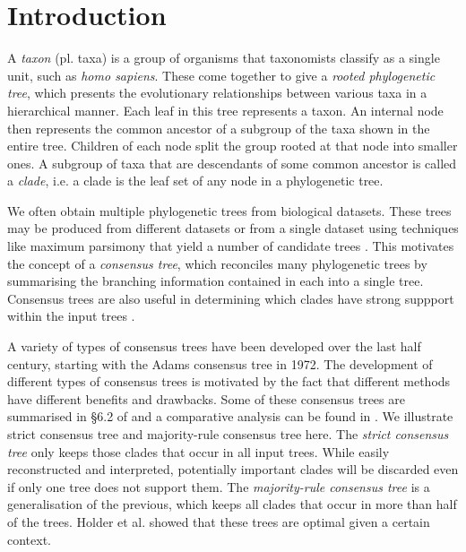 \documentclass[final,1p,times]{elsarticle}
\begin{document}
    \section{Introduction}
    \label{sec:introduction}

    A \textit{taxon} (pl. taxa) is a group of organisms that taxonomists classify as a single unit, such as \textit{homo sapiens}. These come together to give a \textit{rooted phylogenetic tree}, which presents the evolutionary relationships between various taxa in a hierarchical manner. Each leaf in this tree represents a taxon. An internal node then represents the common ancestor of a subgroup of the taxa shown in the entire tree. Children of each node split the group rooted at that node into smaller ones. A subgroup of taxa that are descendants of some common ancestor is called a \textit{clade}, i.e. a clade is the leaf set of any node in a phylogenetic tree.

    We often obtain multiple phylogenetic trees from biological datasets. These trees may be produced from different datasets or from a single dataset using techniques like maximum parsimony that yield a number of candidate trees \cite{bryant1997hunting}. This motivates the concept of a \textit{consensus tree}, which reconciles many phylogenetic trees by summarising the branching information contained in each into a single tree. Consensus trees are also useful in determining which clades have strong suppport within the input trees \cite{felsenstein2004inferring}.

    A variety of types of consensus trees have been developed over the last half century, starting with the Adams consensus tree \cite{adams1972consensus} in 1972. The development of different types of consensus trees is motivated by the fact that different methods have different benefits and drawbacks. Some of these consensus trees are summarised in \S 6.2 of \cite{bryant1997hunting} and a comparative analysis can be found in \cite{bryant2003classification}. We illustrate strict consensus tree and majority-rule consensus tree here. The \textit{strict consensus tree} \cite{sokal1981taxonomic} only keeps those clades that occur in all input trees. While easily reconstructed and interpreted, potentially important clades will be discarded even if only one tree does not support them. The \textit{majority-rule consensus tree} \cite{margush1981consensusn} is a generalisation of the previous, which keeps all clades that occur in more than half of the trees. Holder et al. \cite{holder2008justification} showed that these trees are optimal given a certain context.
\end{document}
